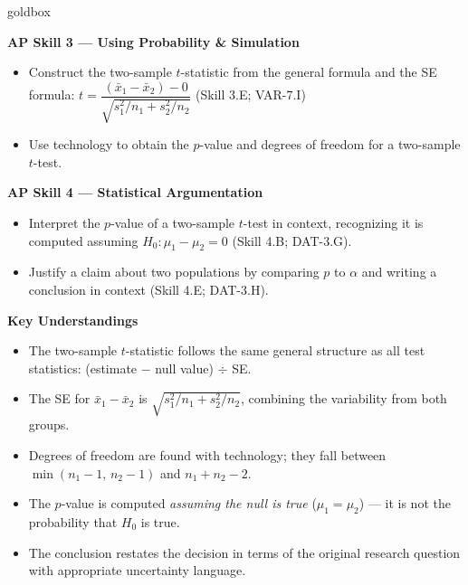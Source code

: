 \documentclass[10pt]{article}
\begin{document}
\renewcommand{\arraystretch}{1.6}
\begin{skillbox}{goldbox}
\begin{minipage}[t]{0.48\linewidth}
    \textbf{AP Skill 3 --- Using Probability \& Simulation}
    \begin{itemize}
        \item Construct the two-sample $t$-statistic from the general formula and the
              SE formula:
              $t = \dfrac{(\bar x_1 - \bar x_2) - 0}{\sqrt{s_1^2/n_1 + s_2^2/n_2}}$
              (Skill 3.E; VAR-7.I)
        \item Use technology to obtain the $p$-value and degrees of freedom for a
              two-sample $t$-test.
    \end{itemize}
    \textbf{AP Skill 4 --- Statistical Argumentation}
    \begin{itemize}
        \item Interpret the $p$-value of a two-sample $t$-test in context, recognizing
              it is computed assuming $H_0: \mu_1 - \mu_2 = 0$ (Skill 4.B; DAT-3.G).
        \item Justify a claim about two populations by comparing $p$ to $\alpha$ and
              writing a conclusion in context (Skill 4.E; DAT-3.H).
    \end{itemize}
\end{minipage}
\hfill
\begin{minipage}[t]{0.48\linewidth}
    \textbf{Key Understandings}
    \begin{itemize}
        \item The two-sample $t$-statistic follows the same general structure as all
              test statistics: (estimate $-$ null value) $\div$ SE.
        \item The SE for $\bar x_1 - \bar x_2$ is $\sqrt{s_1^2/n_1 + s_2^2/n_2}$,
              combining the variability from both groups.
        \item Degrees of freedom are found with technology; they fall between
              $\min(n_1 - 1,\, n_2 - 1)$ and $n_1 + n_2 - 2$.
        \item The $p$-value is computed \emph{assuming the null is true} ($\mu_1 = \mu_2$)
              --- it is not the probability that $H_0$ is true.
        \item The conclusion restates the decision in terms of the original research
              question with appropriate uncertainty language.
    \end{itemize}
\end{minipage}
\end{skillbox}
\end{document}
